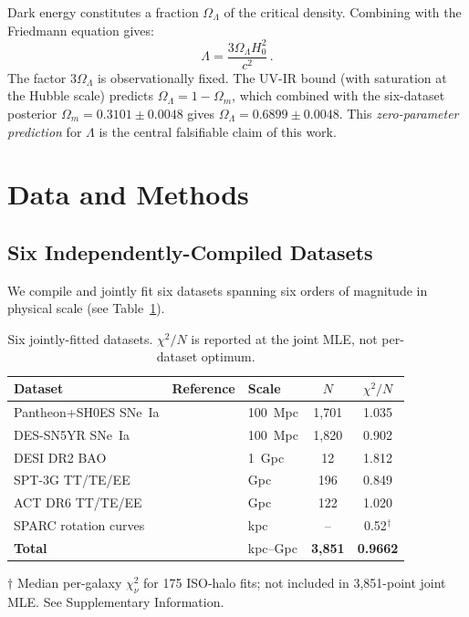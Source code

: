 \documentclass[12pt,a4paper]{article}
\newcommand{\OmL}{\Omega_\Lambda}
\newcommand{\Omm}{\Omega_m}
\begin{document}
Dark energy constitutes a fraction $\OmL$ of the critical density.
Combining with the Friedmann equation gives:
\begin{equation}
\Lambda = \frac{3\OmL H_0^2}{c^2}\,.
\label{eq:Lambda}
\end{equation}
The factor $3\OmL$ is observationally fixed.
The UV-IR bound (with saturation at the Hubble scale) predicts
$\OmL = 1 - \Omm$, which combined with the six-dataset posterior
$\Omm = 0.3101 \pm 0.0048$ gives
$\OmL = 0.6899 \pm 0.0048$.
This \emph{zero-parameter prediction} for $\Lambda$ is the central
falsifiable claim of this work.

\section{Data and Methods}

\subsection{Six Independently-Compiled Datasets}

We compile and jointly fit six datasets spanning six orders of magnitude
in physical scale (see Table~\ref{tab:datasets}).

\begin{table}[t]
\centering
\caption{Six jointly-fitted datasets. $\chi^2/N$ is reported at the joint
MLE, not per-dataset optimum.}
\label{tab:datasets}
\begin{tabular}{@{}lllcc@{}}
\toprule
Dataset & Reference & Scale & $N$ & $\chi^2/N$ \\
\midrule
Pantheon+SH0ES SNe~Ia & \cite{Scolnic2022,Brout2022} & 100~Mpc & 1,701 & 1.035 \\
DES-SN5YR SNe~Ia & \cite{DES2024} & 100~Mpc & 1,820 & 0.902 \\
DESI DR2 BAO & \cite{DESI2024} & 1~Gpc & 12 & 1.812 \\
SPT-3G TT/TE/EE & \cite{Quan2025} & Gpc & 196 & 0.849 \\
ACT DR6 TT/TE/EE & \cite{ACT2025} & Gpc & 122 & 1.020 \\
SPARC rotation curves & \cite{Lelli2016} & kpc & -- & 0.52$^\dagger$ \\
\midrule
\textbf{Total} & & kpc--Gpc & \textbf{3,851} & \textbf{0.9662} \\
\bottomrule
\end{tabular}

\vspace{0.2cm}
\footnotesize{$\dagger$ Median per-galaxy $\chi^2_\nu$ for 175 ISO-halo fits;
not included in 3,851-point joint MLE. See Supplementary Information.}
\end{table}
\end{document}
